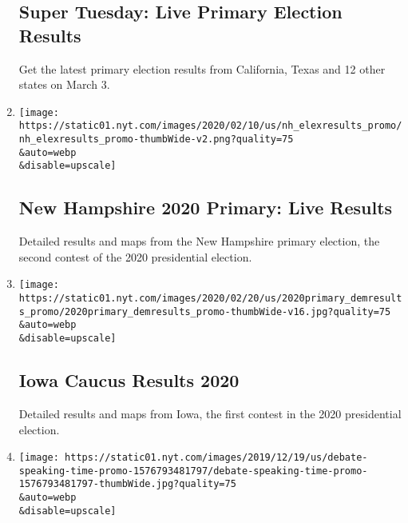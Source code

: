 \begin{enumerate}
  \hypertarget{super-tuesday-live-primary-election-results}{%
  \subsection{Super Tuesday: Live Primary Election
  Results}\label{super-tuesday-live-primary-election-results}}

  Get the latest primary election results from California, Texas and 12
  other states on March 3.
\item
  \href{/interactive/2020/02/11/us/elections/results-new-hampshire-primary-election.html}{}

  \texttt{[image: https://static01.nyt.com/images/2020/02/10/us/nh\_elexresults\_promo/nh\_elexresults\_promo-thumbWide-v2.png?quality=75\\\&auto=webp\\\&disable=upscale]}

  \hypertarget{new-hampshire-2020-primary-live-results}{%
  \subsection{New Hampshire 2020 Primary: Live
  Results}\label{new-hampshire-2020-primary-live-results}}

  Detailed results and maps from the New Hampshire primary election, the
  second contest of the 2020 presidential election.
\item
  \href{/interactive/2020/02/04/us/elections/results-iowa-caucus.html}{}

  \texttt{[image: https://static01.nyt.com/images/2020/02/20/us/2020primary\_demresults\_promo/2020primary\_demresults\_promo-thumbWide-v16.jpg?quality=75\\\&auto=webp\\\&disable=upscale]}

  \hypertarget{iowa-caucus-results-2020}{%
  \subsection{Iowa Caucus Results 2020}\label{iowa-caucus-results-2020}}

  Detailed results and maps from Iowa, the first contest in the 2020
  presidential election.
\item
  \href{/interactive/2019/12/19/us/elections/debate-speaking-time.html}{}

  \texttt{[image: https://static01.nyt.com/images/2019/12/19/us/debate-speaking-time-promo-1576793481797/debate-speaking-time-promo-1576793481797-thumbWide.jpg?quality=75\\\&auto=webp\\\&disable=upscale]}

  \hypertarget{which-candidates-got-the-most-speaking-time-in-the-democratic-debate}{%
}
\end{enumerate}
